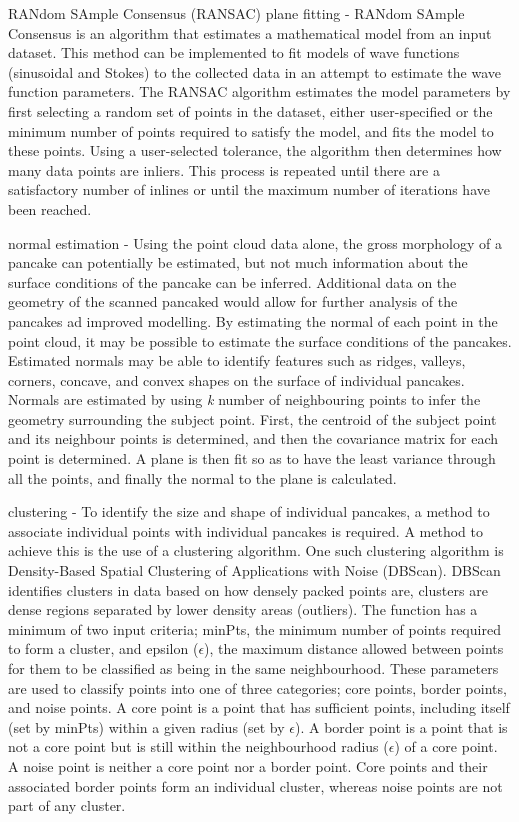 RANdom SAmple Consensus (RANSAC) plane fitting - RANdom SAmple Consensus is an algorithm that estimates a mathematical model from an input dataset. This method can be implemented to fit models of wave functions (sinusoidal and Stokes) to the collected data in an attempt to estimate the wave function parameters. The RANSAC algorithm estimates the model parameters by first selecting a random set of points in the dataset, either user-specified or the minimum number of points required to satisfy the model, and fits the model to these points. Using a user-selected tolerance, the algorithm then determines how many data points are inliers. This process is repeated until there are a satisfactory number of inlines or until the maximum number of iterations have been reached.  

normal estimation - Using the point cloud data alone, the gross morphology of a pancake can potentially be estimated, but not much information about the surface conditions of the pancake can be inferred. Additional data on the geometry of the scanned pancaked would allow for further analysis of the pancakes ad improved modelling. By estimating the normal of each point in the point cloud, it may be possible to estimate the surface conditions of the pancakes. Estimated normals may be able to identify features such as ridges, valleys, corners, concave, and convex shapes on the surface of individual pancakes. Normals are estimated by using \textit{k} number of neighbouring points to infer the geometry surrounding the subject point. First, the centroid of the subject point and its neighbour points is determined, and then the covariance matrix for each point is determined. A plane is then fit so as to have the least variance through all the points, and finally the normal to the plane is calculated.

clustering - To identify the size and shape of individual pancakes, a method to associate individual points with individual pancakes is required. A method to achieve this is the use of a clustering algorithm. One such clustering algorithm is Density-Based Spatial Clustering of Applications with Noise (DBScan). DBScan identifies clusters in data based on how densely packed points are, clusters are dense regions separated by lower density areas (outliers). The function has a minimum of two input criteria; minPts, the minimum number of points required to form a cluster, and epsilon ($\epsilon$), the maximum distance allowed between points for them to be classified as being in the same neighbourhood. These parameters are used to classify points into one of three categories; core points, border points, and noise points. A core point is a point that has sufficient points, including itself (set by minPts) within a given radius (set by $\epsilon$). A border point is a point that is not a core point but is still within the neighbourhood radius ($\epsilon$) of a core point. A noise point is neither a core point nor a border point. Core points and their associated border points form an individual cluster, whereas noise points are not part of any cluster.

